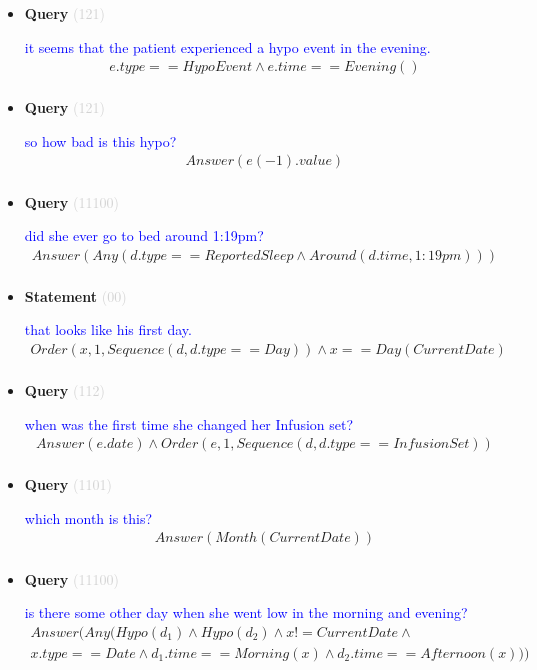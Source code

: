 \documentclass[11pt]{article}
\newcommand{\key}[1]{\textcolor{lightgray}{#1}}
\newcounter{CQuery}
\newcounter{CStatement}
\begin{document}
\begin{itemize}
\item
\textbf{Query\theCQuery} \key{(121)} \addtocounter{CQuery}{1}
\textcolor{blue}{ it seems that the patient experienced a hypo event in the evening. }
\begin{multline*}
e.type==HypoEvent \wedge e.time==Evening() \\ 
\end{multline*}


\item
\textbf{Query\theCQuery} \key{(121)} \addtocounter{CQuery}{1}
\textcolor{blue}{ so how bad is this hypo? }
\begin{multline*}
Answer(e(-1).value) \\ 
\end{multline*}


\item
\textbf{Query\theCQuery} \key{(11100)} \addtocounter{CQuery}{1}
\textcolor{blue}{ did she ever go to bed around 1:19pm? }
\begin{multline*}
Answer(Any(d.type==ReportedSleep \wedge Around(d.time, 1:19pm))) \\ 
\end{multline*}


\item
\textbf{Statement\theCStatement} \key{(00)} \addtocounter{CStatement}{1}
\textcolor{blue}{ that looks like his first day. }
\begin{multline*}
Order(x, 1, Sequence(d, d.type==Day)) \wedge x==Day(CurrentDate) \\ 
\end{multline*}


\item
\textbf{Query\theCQuery} \key{(112)} \addtocounter{CQuery}{1}
\textcolor{blue}{ when was the first time she changed her Infusion set? }
\begin{multline*}
Answer(e.date) \wedge Order(e, 1, Sequence(d, d.type==InfusionSet)) \\ 
\end{multline*}


\item
\textbf{Query\theCQuery} \key{(1101)} \addtocounter{CQuery}{1}
\textcolor{blue}{ which month is this? }
\begin{multline*}
Answer(Month(CurrentDate)) \\ 
\end{multline*}


\item
\textbf{Query\theCQuery} \key{(11100)} \addtocounter{CQuery}{1}
\textcolor{blue}{ is there some other day when she went low in the morning and evening? }
\begin{multline*}
Answer(Any(Hypo(d_1) \wedge Hypo(d_2) \wedge x != CurrentDate \wedge \\ 
x.type==Date \wedge d_1.time==Morning(x) \wedge d_2.time==Afternoon(x))) \\ 
\end{multline*}



\end{itemize}
\end{document}
